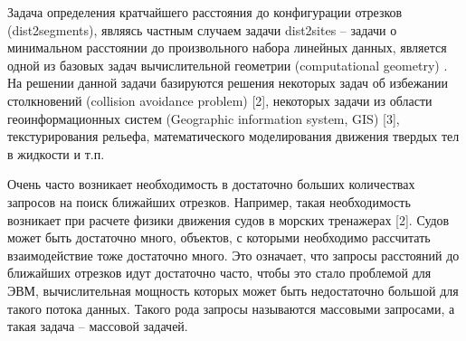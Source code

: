 
\startprefacepage

Задача определения кратчайшего расстояния до конфигурации отрезков
(dist2segments), являясь частным случаем задачи dist2sites – задачи о
минимальном расстоянии до произвольного набора линейных данных,
является одной из базовых задач вычислительной геометрии (computational
geometry) \cite{PrSh}. На решении данной задачи базируются решения некоторых задач
об избежании столкновений (collision avoidance problem) [2], некоторых задачи
из области геоинформационных систем (Geographic information system, GIS) [3],
текстурирования рельефа, математического моделирования движения твердых
тел в жидкости и т.п.

Очень часто возникает необходимость в достаточно
больших количествах запросов на поиск ближайших отрезков.
Например, такая необходимость возникает при расчете физики движения судов в морских
тренажерах [2]. Судов может быть достаточно много, объектов, с которыми
необходимо рассчитать взаимодействие тоже достаточно много. Это означает,
что запросы расстояний до ближайших отрезков идут достаточно часто, чтобы это стало проблемой
для ЭВМ, вычислительная мощность которых может быть недостаточно
большой для такого потока данных. Такого рода запросы называются
массовыми запросами, а такая задача – массовой задачей.

